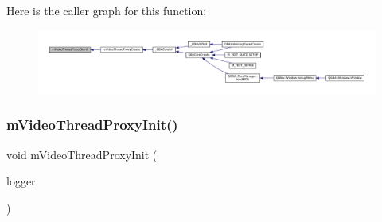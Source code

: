 Here is the caller graph for this function\+:
\nopagebreak
\begin{figure}[H]
\begin{center}
\leavevmode
\includegraphics[width=350pt]{thread-proxy_8c_a7d6faab8646db46852a09b83af7216e0_icgraph}
\end{center}
\end{figure}
\mbox{\label{thread-proxy_8c_a6af434b062813108e9046e2742ef9d15}} 
\subsubsection{\texorpdfstring{m\+Video\+Thread\+Proxy\+Init()}{mVideoThreadProxyInit()}}
{\footnotesize\ttfamily void m\+Video\+Thread\+Proxy\+Init (\begin{DoxyParamCaption}\item[{struct m\+Video\+Logger $\ast$}]{logger }\end{DoxyParamCaption})\hspace{0.3cm}{\ttfamily [static]}}

